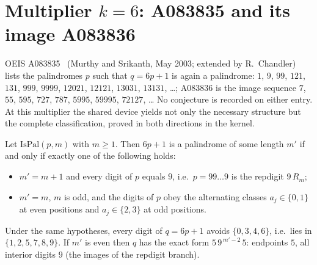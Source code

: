 \providecommand{\IsPal}{\mathrm{IsPal}}
\makeatletter
{}
\makeatother

\section{Multiplier $k = 6$: A083835 and its image A083836}
\label{sec:k6}

OEIS A083835~\cite{oeis} (Murthy and Srikanth, May 2003;
extended by R.~Chandler) lists the palindromes $p$ such
that $q = 6p+1$ is again a palindrome:
$1$, $9$, $99$, $121$, $131$, $999$, $9999$, $12021$,
$12121$, $13031$, $13131$, \ldots; A083836 is the image
sequence $7$, $55$, $595$, $727$, $787$, $5995$,
$59995$, $72127$, \ldots
No conjecture is recorded on either entry. At this
multiplier the shared device yields not only the
necessary structure but the complete classification,
proved in both directions in the kernel.

\begin{theorem}
\label{thm:k6-iff}
Let $\IsPal(p,m)$ with $m \ge 1$. Then $6p+1$ is a
palindrome of some length $m'$ if and only if exactly
one of the following holds:
\begin{itemize}
\item[(i)] $m' = m + 1$ and every digit of $p$ equals
$9$, i.e.\ $p = 99\ldots9$ is the repdigit $9\,R_m$;
\item[(ii)] $m' = m$, $m$ is odd, and the digits of $p$
obey the alternating classes $a_j \in \{0,1\}$ at even
positions and $a_j \in \{2,3\}$ at odd positions.
\end{itemize}
\end{theorem}

\begin{corollary}
\label{cor:k6-img}
Under the same hypotheses, every digit of $q = 6p+1$
avoids $\{0,3,4,6\}$, i.e.\ lies in $\{1,2,5,7,8,9\}$.
If $m'$ is even then $q$ has the exact form
$5\,9^{\,m'-2}\,5$: endpoints $5$, all interior digits
$9$ (the images of the repdigit branch).
\end{corollary}

